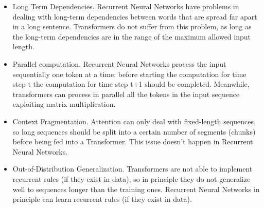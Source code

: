 \begin{itemize}
    \item Long Term Dependencies. Recurrent Neural Networks have problems in dealing with long-term dependencies between words that are spread far apart in a long sentence. Transformers do not suffer from this problem, as long as the long-term dependencies are in the range of the maximum allowed input length.
    
    \item Parallel computation. Recurrent Neural Networks process the input sequentially one token at a time: before starting the computation for time step t the computation for time step t+1 should be completed. Meanwhile, transformers can process in parallel all the tokens in the input sequence exploiting matrix multiplication.
    
    \item Context Fragmentation. Attention can only deal with fixed-length sequences, so long sequences should be split into a certain number of segments (chunks) before being fed into a Transformer. This issue doesn't happen in Recurrent Neural Networks.

    \item Out-of-Distribution Generalization. Transformers are not able to implement recurrent rules (if they exist in data), so in principle they do not generalize well to sequences longer than the training ones. Recurrent Neural Networks in principle can learn recurrent rules (if they exist in data).
\end{itemize}




